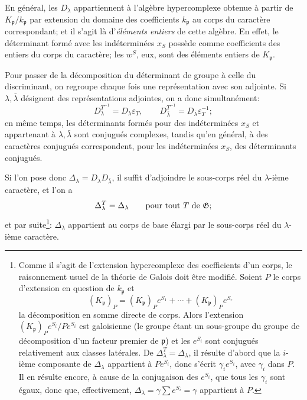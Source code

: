 En général, les \(D_\lambda\) appartiennent à l'algèbre hypercomplexe obtenue à partir de \(K_{\mathfrak{p}}/k_{\mathfrak{p}}\) par extension du domaine des coefficients \(k_{\mathfrak{p}}\) au corps du caractère correspondant; et il s'agit là d'\emph{éléments entiers} de cette algèbre. En effet, le déterminant formé avec les indéterminées \(x_S\) possède comme coefficients des entiers du corps du caractère; les \(w^S\), eux, sont des éléments entiers de \(K_{\mathfrak{p}}\).

Pour passer de la décomposition du déterminant de groupe à celle du discriminant, on regroupe chaque fois une représentation avec son adjointe. Si \(\lambda,\bar\lambda\) désignent des représentations adjointes, on a donc simultanément:
\[
        D_\lambda^{T^{-1}}=D_\lambda\varepsilon_T,
        \qquad
        D_{\bar\lambda}^{T^{-1}}=D_{\bar\lambda}\varepsilon_T^{-1};
\]
en même temps, les déterminants formés pour des indéterminées \(x_S\) et appartenant à \(\lambda,\bar\lambda\) sont conjugués complexes, tandis qu'en général, à des caractères conjugués correspondent, pour les indéterminées \(x_S\), des déterminants conjugués.

Si l'on pose donc \(\Delta_\lambda=D_\lambda D_{\bar\lambda}\), il suffit d'adjoindre le sous-corps réel du \(\lambda\)-ième caractère, et l'on a
\[
        \Delta_\lambda^T=\Delta_\lambda
        \qquad\hbox{pour tout }T\hbox{ de }\mathfrak{G};
\]
et par suite\footnote{Comme il s'agit de l'extension hypercomplexe des coefficients d'un corps, le raisonnement usuel de la théorie de Galois doit être modifié. Soient \(P\) le corps d'extension en question de \(k_{\mathfrak{p}}\) et
\[
        (K_{\mathfrak{p}})_P=(K_{\mathfrak{p}})_P e^{S_1}+\cdots+(K_{\mathfrak{p}})_P e^{S_r}
\]
la décomposition en somme directe de corps. Alors l'extension \( (K_{\mathfrak{p}})_P e^{S_i}/Pe^{S_i}\) est galoisienne (le groupe étant un sous-groupe du groupe de décomposition d'un facteur premier de \(\mathfrak{p}\)) et les \(e^{S_i}\) sont conjugués relativement aux classes latérales. De \(\Delta_\lambda^T=\Delta_\lambda\), il résulte d'abord que la \(i\)-ième composante de \(\Delta_\lambda\) appartient à \(Pe^{S_i}\), donc s'écrit \(\gamma_i e^{S_i}\), avec \(\gamma_i\) dans \(P\). Il en résulte encore, à cause de la conjugaison des \(e^{S_i}\), que tous les \(\gamma_i\) sont égaux, donc que, effectivement, \(\Delta_\lambda=\gamma\sum e^{S_i}=\gamma\) appartient à \(P\).}: \(\Delta_\lambda\) appartient au corps de base élargi par le sous-corps réel du \(\lambda\)-ième caractère.


